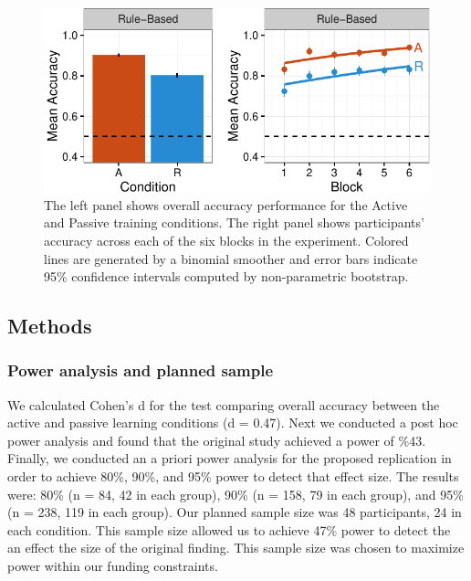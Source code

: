 \documentclass[10pt, letterpaper]{article}
\newenvironment{CodeChunk}{}{}
\begin{document}
\begin{CodeChunk}
\captionsetup{width=0.8\textwidth}\begin{figure}[t]

{\centering \includegraphics{figs/exp1a_acc_plot-1} 

}

\caption[The left panel shows overall accuracy performance for the Active and Passive training conditions]{The left panel shows overall accuracy performance for the Active and Passive training conditions. The right panel shows participants' accuracy across each of the six blocks in the experiment. Colored lines are generated by a binomial smoother and error bars indicate 95\% confidence intervals computed by non-parametric bootstrap.}\label{fig:exp1a_acc_plot}
\end{figure}
\end{CodeChunk}

\subsection{Methods}\label{methods}

\subsubsection{Power analysis and planned
sample}\label{power-analysis-and-planned-sample}

We calculated Cohen's d for the test comparing overall accuracy between
the active and passive learning conditions (d = 0.47). Next we conducted
a post hoc power analysis and found that the original study achieved a
power of \%43. Finally, we conducted an a priori power analysis for the
proposed replication in order to achieve 80\%, 90\%, and 95\% power to
detect that effect size. The results were: 80\% (n = 84, 42 in each
group), 90\% (n = 158, 79 in each group), and 95\% (n = 238, 119 in each
group). Our planned sample size was 48 participants, 24 in each
condition. This sample size allowed us to achieve 47\% power to detect
the an effect the size of the original finding. This sample size was
chosen to maximize power within our funding constraints.
\end{document}
